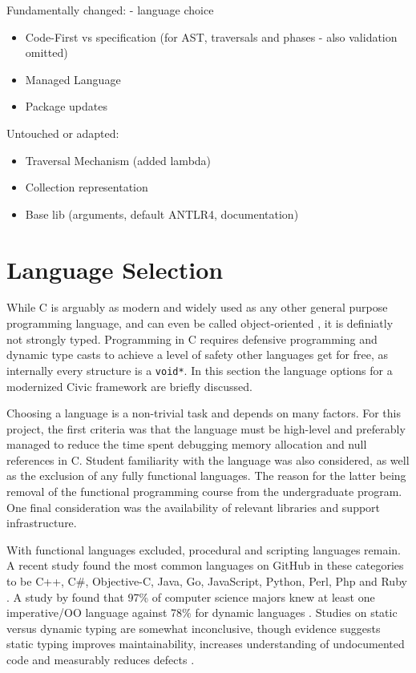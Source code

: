 \documentclass[twoside,openright]{uva-bachelor-thesis}
\newcommand{\code}[1]{\texttt{\footnotesize#1}}
\begin{document}
		Fundamentally changed:
		- language choice
		\begin{itemize}
			\item Code-First vs specification (for AST, traversals and phases - also validation omitted)
			\item Managed Language
			\item Package updates
		\end{itemize}
		Untouched or adapted:
		\begin{itemize}
			\item Traversal Mechanism (added lambda)
			\item Collection representation
			\item Base lib (arguments, default ANTLR4, documentation)
		\end{itemize}
	
	\section{Language Selection}
		While C is arguably as modern and widely used as any other general purpose programming language, and can even be called object-oriented \cite{book:schreiner}, it is definiatly not strongly typed. Programming in C requires defensive programming and dynamic type casts to achieve a level of safety other languages get for free, as internally every structure is a \code{void*}. In this section the language options for a modernized Civic framework are briefly discussed.
		
		Choosing a language is a non-trivial task and depends on many factors. For this project, the first criteria was that the language must be high-level and preferably managed to reduce the time spent debugging memory allocation and null references in C. Student familiarity with the language was also considered, as well as the exclusion of any fully functional languages. The reason for the latter being removal of the functional programming course from the undergraduate program. One final consideration was the availability of relevant libraries and support infrastructure. 
		
		With functional languages excluded, procedural and scripting languages remain. A recent study found the most common languages on GitHub in these categories to be C++, C\#, Objective-C, Java, Go, JavaScript, Python, Perl, Php and Ruby \cite{Ray2014}. A study by \citeauthor{Meyerovich2013} found that 97\% of computer science majors knew at least one imperative/OO language against 78\% for dynamic languages \cite{Meyerovich2013}. Studies on static versus dynamic typing are somewhat inconclusive, though evidence suggests static typing improves maintainability, increases understanding of undocumented code and measurably reduces defects \cite{Hanenberg2014,Ray2014}.
		
\end{document}
